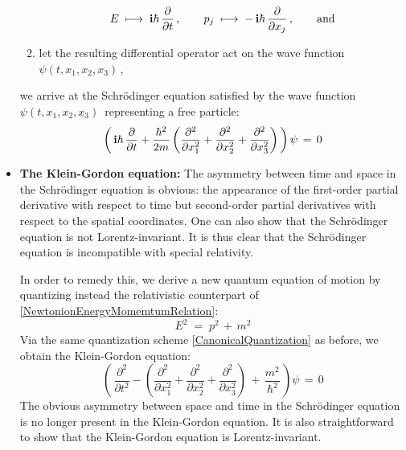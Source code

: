 \begin{itemize}
\begin{enumerate}
		\begin{equation}
		\label{CanonicalQuantization}
		E \;\longmapsto\; \textnormal{\bf i}\hbar\,\dfrac{\partial}{\partial t}\,,
		\quad\quad
		p_{j} \;\longmapsto\; -\,\textnormal{\bf i}\hbar\,\dfrac{\partial}{\partial x_{j}}\,,
		\quad\quad
		\textnormal{and}
		\end{equation}
	\item
		let the resulting differential operator act on the wave function
		\,$\psi(t,x_{1},x_{2},x_{3})$\,,\,
	\end{enumerate}
	we arrive at the Schr\"odinger equation satisfied by the wave function
	\,$\psi(t,x_{1},x_{2},x_{3})$\,
	representing a free particle:
	\begin{equation*}
	\left(\,\textnormal{\bf i}\hbar\,\dfrac{\partial}{\partial t} + \dfrac{\hbar^{2}}{2m}
		\left(
			\dfrac{\partial^{2}}{\partial x_{1}^{2}}
			+ \dfrac{\partial^{2}}{\partial x_{2}^{2}}
			+ \dfrac{\partial^{2}}{\partial x_{3}^{2}}
			\right)
		\,\right)
	\psi
	\,=\,
		0
	\end{equation*}
\item
	\textbf{The Klein-Gordon equation:}
	\vskip 0.01cm
	The asymmetry between time and space in the Schr\"odinger equation is obvious:
	the appearance of the first-order partial derivative with respect to time
	but second-order partial derivatives with respect to the spatial coordinates.
	One can also show that the Schr\"odinger equation is not Lorentz-invariant.
	It is thus clear that the Schr\"odinger equation is incompatible with special relativity.
	
	In order to remedy this, we derive a new quantum equation of motion by quantizing instead
	the relativistic counterpart of \eqref{NewtonionEnergyMomemtumRelation}:
	\begin{equation}
	\label{RelativisticEnergyMomemtumRelation}
	E^{2} \;=\; p^{2} \,+\, m^{2}
	\end{equation}
	Via the same quantization scheme
	\eqref{CanonicalQuantization}
	as before, we obtain the Klein-Gordon equation:
	\begin{equation*}
	\left(\,\dfrac{\partial^{2}}{\partial t^{2}}
	- \left(
		\dfrac{\partial^{2}}{\partial x_{1}^{2}}
		+ \dfrac{\partial^{2}}{\partial x_{2}^{2}}
		+ \dfrac{\partial^{2}}{\partial x_{3}^{2}}
		\right)
	\,+\,
		\dfrac{m^{2}}{\hbar^{2}}
		\,\right)
	\psi
	\,=\,
		0
	\end{equation*}
	The obvious asymmetry between space and time in the Schr\"odinger equation is no longer
	present in the Klein-Gordon equation.
	It is also straightforward to show that the Klein-Gordon equation is Lorentz-invariant.
	

\end{itemize}
